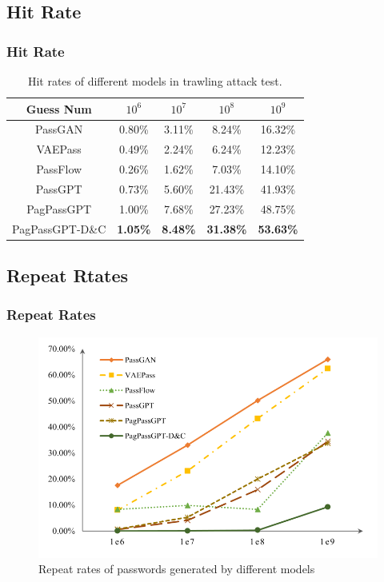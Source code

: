 \documentclass[
	12pt, %
]{beamer}
\begin{document}
\subsection{Hit Rate}
\begin{frame}
	\frametitle{Hit Rate}
	

	\begin{table}[h]
		\centering
		\caption{Hit rates of different models in trawling attack test.}
		\begin{tabular}{c c c c c}
			\hline
			\textbf{Guess Num} & \textbf{$10^6$} & \textbf{$10^7$} & \textbf{$10^8$} & \textbf{$10^9$} \\ \hline \hline
			PassGAN & 0.80\% & 3.11\% & 8.24\% & 16.32\% \\ 
			VAEPass & 0.49\% & 2.24\% & 6.24\% & 12.23\% \\ 
			PassFlow & 0.26\% & 1.62\% & 7.03\% & 14.10\% \\ 
			PassGPT & 0.73\% & 5.60\% & 21.43\% & 41.93\% \\ 
			PagPassGPT & 1.00\% & 7.68\% & 27.23\% & 48.75\% \\ 
			PagPassGPT-D\&C & \textbf{1.05\%} & \textbf{8.48\%} & \textbf{31.38\%} & \textbf{53.63\%} \\ \hline
		\end{tabular}
		\label{table:hit_rates}
	\end{table}
\end{frame}




\subsection{Repeat Rtates}
\begin{frame}
	\frametitle{Repeat Rates}
	
	
	\begin{figure}
		\centering
		\includegraphics[width=0.8\linewidth]{Images/img7}
		\caption{Repeat rates of passwords generated by different models}
		\label{fig:Repeat rates of passwords generated by different models}
	\end{figure}
\end{frame}
\end{document}
